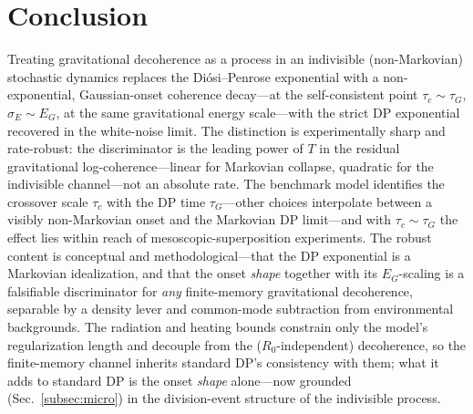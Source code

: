 \documentclass[aps,prd,onecolumn,amsmath,amssymb,nofootinbib,superscriptaddress]{revtex4-2}
\begin{document}
\section{Conclusion}\label{sec:conclusion}

Treating gravitational decoherence as a process in an indivisible (non-Markovian) stochastic dynamics
replaces the Di\'osi--Penrose exponential with a non-exponential, Gaussian-onset coherence
decay---at the self-consistent point $\tau_c\sim\tau_G$, $\sigma_E\sim E_G$, at the same gravitational
energy scale---with the strict DP exponential recovered in the white-noise limit. The distinction is
experimentally sharp and rate-robust: the discriminator is the leading power of $T$ in the residual
gravitational log-coherence---linear for Markovian collapse, quadratic for the indivisible
channel---not an absolute rate. The benchmark model identifies the crossover scale $\tau_c$ with the
DP time $\tau_G$---other choices interpolate between a visibly non-Markovian onset and the Markovian
DP limit---and with $\tau_c\sim\tau_G$ the effect lies within reach of mesoscopic-superposition
experiments. The robust content is conceptual and methodological---that the DP exponential is a
Markovian idealization, and that the onset \emph{shape} together with its $E_G$-scaling is a
falsifiable discriminator for \emph{any} finite-memory gravitational decoherence, separable by a
density lever and common-mode subtraction from environmental backgrounds. The radiation and heating
bounds constrain only the model's regularization length and decouple from the ($R_0$-independent)
decoherence, so the finite-memory channel inherits standard DP's consistency with them; what it adds to
standard DP is the onset \emph{shape} alone---now grounded (Sec.~\ref{subsec:micro}) in the
division-event structure of the indivisible process.
\end{document}
